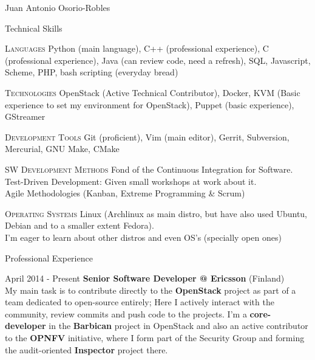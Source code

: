 \documentclass[english,11pt,letterpaper]{article}
\begin{document}
\begin{cv}{Juan Antonio Osorio-Robles}
	\begin{cvlist}{Technical Skills}
			\item [\textsc{Languages}]
                Python (main language), C++ (professional experience), C
                (professional experience), Java (can review code, need a
                refresh), SQL, Javascript, Scheme, PHP, bash
                scripting (everyday bread)
			\item [\textsc{Technologies}]
                OpenStack (Active Technical Contributor), Docker,
                KVM (Basic experience to set my environment for OpenStack),
                Puppet (basic experience), GStreamer
			\item [\textsc{Development Tools}]
                Git (proficient), Vim (main editor), Gerrit, Subversion,
                Mercurial, GNU Make, CMake
			\item [\textsc{SW Development Methods}]
				Fond of the Continuous Integration for Software.\\
                Test-Driven Development: Given small workshops at work about
                it.\\
                Agile Methodologies (Kanban, Extreme Programming \& Scrum)
			\item [\textsc{Operating Systems}]
                Linux (Archlinux as main distro, but have also used Ubuntu,
                Debian and to a smaller extent Fedora).\\
                I'm eager to learn about other distros and even OS's (specially
                open ones)
	\end{cvlist}

	\begin{cvlist}{Professional Experience}
		\item [April 2014 - Present]
            \textbf{Senior Software Developer @ Ericsson} (Finland)\\
            My main task is to contribute directly to the
            \textbf{OpenStack} project as part of a team dedicated to
            open-source entirely; Here I actively interact with the
            community, review commits and push code to the projects. I'm a
            \textbf{core-developer} in the \textbf{Barbican} project in
            OpenStack and also an active contributor to the \textbf{OPNFV}
            initiative, where I form part of the Security Group and forming
            the audit-oriented \textbf{Inspector} project there.\\


\end{cvlist}
\end{cv}
\end{document}
